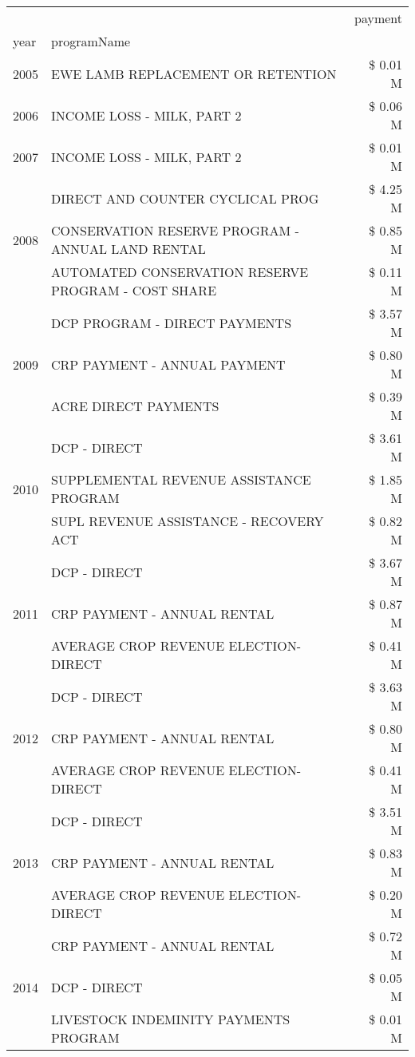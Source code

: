 \begin{tabular}{llr}
\toprule
 &  & payment \\
year & programName &  \\
\midrule
2005 & EWE LAMB REPLACEMENT OR RETENTION & \$ 0.01 M \\
\cline{1-3}
2006 & INCOME LOSS - MILK, PART 2 & \$ 0.06 M \\
\cline{1-3}
2007 & INCOME LOSS - MILK, PART 2 & \$ 0.01 M \\
\cline{1-3}
\multirow[t]{3}{*}{2008} & DIRECT AND COUNTER CYCLICAL PROG & \$ 4.25 M \\
 & CONSERVATION RESERVE PROGRAM - ANNUAL LAND RENTAL & \$ 0.85 M \\
 & AUTOMATED CONSERVATION RESERVE PROGRAM - COST SHARE & \$ 0.11 M \\
\cline{1-3}
\multirow[t]{3}{*}{2009} & DCP PROGRAM - DIRECT PAYMENTS & \$ 3.57 M \\
 & CRP PAYMENT - ANNUAL PAYMENT & \$ 0.80 M \\
 & ACRE DIRECT PAYMENTS & \$ 0.39 M \\
\cline{1-3}
\multirow[t]{3}{*}{2010} & DCP - DIRECT & \$ 3.61 M \\
 & SUPPLEMENTAL REVENUE ASSISTANCE PROGRAM & \$ 1.85 M \\
 & SUPL REVENUE ASSISTANCE - RECOVERY ACT & \$ 0.82 M \\
\cline{1-3}
\multirow[t]{3}{*}{2011} & DCP - DIRECT & \$ 3.67 M \\
 & CRP PAYMENT - ANNUAL RENTAL & \$ 0.87 M \\
 & AVERAGE CROP REVENUE ELECTION-DIRECT & \$ 0.41 M \\
\cline{1-3}
\multirow[t]{3}{*}{2012} & DCP - DIRECT & \$ 3.63 M \\
 & CRP PAYMENT - ANNUAL RENTAL & \$ 0.80 M \\
 & AVERAGE CROP REVENUE ELECTION-DIRECT & \$ 0.41 M \\
\cline{1-3}
\multirow[t]{3}{*}{2013} & DCP - DIRECT & \$ 3.51 M \\
 & CRP PAYMENT - ANNUAL RENTAL & \$ 0.83 M \\
 & AVERAGE CROP REVENUE ELECTION-DIRECT & \$ 0.20 M \\
\cline{1-3}
\multirow[t]{3}{*}{2014} & CRP PAYMENT - ANNUAL RENTAL & \$ 0.72 M \\
 & DCP - DIRECT & \$ 0.05 M \\
 & LIVESTOCK INDEMINITY PAYMENTS PROGRAM & \$ 0.01 M \\
\cline{1-3}

\end{tabular}
